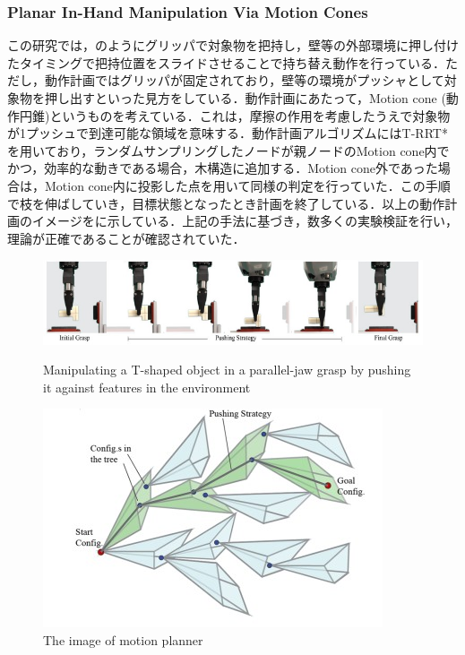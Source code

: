 \documentclass[a4paper,twoside,12pt,papersize, dvipdfmx]{iirthesis}
\begin{document}
\subsubsection{Planar In-Hand Manipulation Via Motion Cones \cite{chavan-dafle2020}}
この研究では，のようにグリッパで対象物を把持し，壁等の外部環境に押し付けたタイミングで把持位置をスライドさせることで持ち替え動作を行っている．ただし，動作計画ではグリッパが固定されており，壁等の環境がプッシャとして対象物を押し出すといった見方をしている．動作計画にあたって，Motion cone (動作円錐)というものを考えている．これは，摩擦の作用を考慮したうえで対象物が1プッシュで到達可能な領域を意味する．動作計画アルゴリズムにはT-RRT*を用いており，ランダムサンプリングしたノードが親ノードのMotion cone内でかつ，効率的な動きである場合，木構造に追加する．Motion cone外であった場合は，Motion cone内に投影した点を用いて同様の判定を行っていた．この手順で枝を伸ばしていき，目標状態となったとき計画を終了している．以上の動作計画のイメージをに示している．上記の手法に基づき，数多くの実験検証を行い，理論が正確であることが確認されていた．
\begin{figure}
\begin{minipage}{0.49\hsize}
\centering
\includegraphics[width=0.9\hsize]{fig/1-introduction/chavan-dafle/manipulation.jpg}
\caption{Manipulating a T-shaped object in a parallel-jaw grasp by pushing it against features in the environment \cite{chavan-dafle2020}}
\label{fig::maniT}
\end{minipage} \hfill
\begin{minipage}{0.49\hsize}
\centering
\includegraphics[width=0.8\hsize]{fig/1-introduction/chavan-dafle/rrtimage.jpg}
\caption{The image of motion planner \cite{chavan-dafle2020}}
\label{fig::rrtimage}
\end{minipage}
\end{figure}
\end{document}
